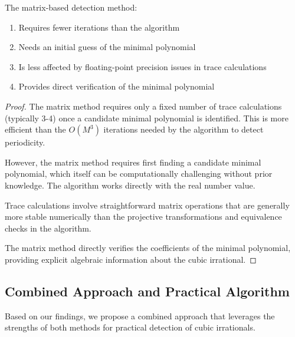 \begin{proposition}
The matrix-based detection method:
\begin{enumerate}
    \item Requires fewer iterations than the \HAPD{} algorithm
    \item Needs an initial guess of the minimal polynomial
    \item Is less affected by floating-point precision issues in trace calculations
    \item Provides direct verification of the minimal polynomial
\end{enumerate}
\end{proposition}

\begin{proof}
The matrix method requires only a fixed number of trace calculations (typically 3-4) once a candidate minimal polynomial is identified. This is more efficient than the $O(M^3)$ iterations needed by the \HAPD{} algorithm to detect periodicity.

However, the matrix method requires first finding a candidate minimal polynomial, which itself can be computationally challenging without prior knowledge. The \HAPD{} algorithm works directly with the real number value.

Trace calculations involve straightforward matrix operations that are generally more stable numerically than the projective transformations and equivalence checks in the \HAPD{} algorithm.

The matrix method directly verifies the coefficients of the minimal polynomial, providing explicit algebraic information about the cubic irrational.
\end{proof}

\subsection{Combined Approach and Practical Algorithm}

Based on our findings, we propose a combined approach that leverages the strengths of both methods for practical detection of cubic irrationals.

